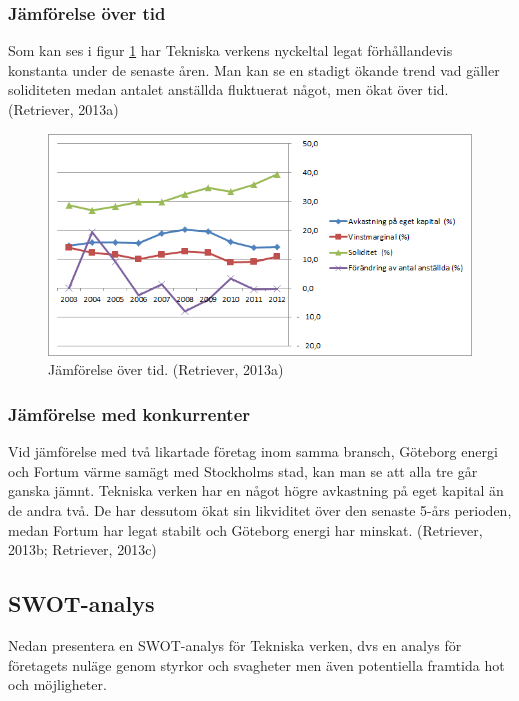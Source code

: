 \documentclass[10pt,a4paper]{article}
\begin{document}
\subsubsection{Jämförelse över tid} 
Som kan ses i figur \ref{fig:jamfor} har Tekniska verkens nyckeltal legat
förhållandevis konstanta under de senaste åren. Man kan se en stadigt ökande trend vad gäller soliditeten medan antalet anställda fluktuerat något, men ökat över tid. (Retriever, 2013a)
\begin{figure}[H] 
\centerline{\includegraphics[scale=0.8]{Bilder/jamforelse_over_tid.png}}
\caption{Jämförelse över tid. (Retriever, 2013a)}
\label{fig:jamfor}
\end{figure}  

\subsubsection{Jämförelse med konkurrenter}
Vid jämförelse med två likartade företag inom samma bransch, Göteborg energi och Fortum värme samägt med Stockholms stad, kan man se att alla tre går ganska jämnt. Tekniska verken har en något högre avkastning på eget kapital än de andra två. De har dessutom ökat sin likviditet över den senaste 5-års perioden, medan Fortum har legat stabilt och Göteborg energi har minskat. (Retriever, 2013b; Retriever, 2013c)
\subsection{SWOT-analys}
Nedan presentera en SWOT-analys för Tekniska verken, dvs en analys för företagets nuläge genom styrkor och svagheter men även potentiella framtida hot och möjligheter. 
\end{document}
